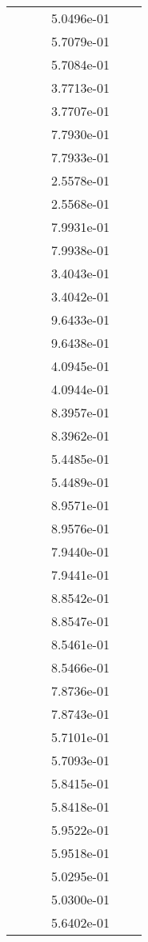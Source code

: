 \begin{xltabular}{\textwidth}{r|rS[table-format=1.3e+2]S[table-format=1.4e+2]S[table-format=1.4e+2]S[table-format=-1.5]}
&  &  & 5.0496e-01 & & \\
&  &  & 5.7079e-01 & & \\
&  &  & 5.7084e-01 & & \\
&  &  & 3.7713e-01 & & \\
&  &  & 3.7707e-01 & & \\
&  &  & 7.7930e-01 & & \\
&  &  & 7.7933e-01 & & \\
&  &  & 2.5578e-01 & & \\
&  &  & 2.5568e-01 & & \\
&  &  & 7.9931e-01 & & \\
&  &  & 7.9938e-01 & & \\
&  &  & 3.4043e-01 & & \\
&  &  & 3.4042e-01 & & \\
&  &  & 9.6433e-01 & & \\
&  &  & 9.6438e-01 & & \\
&  &  & 4.0945e-01 & & \\
&  &  & 4.0944e-01 & & \\
&  &  & 8.3957e-01 & & \\
&  &  & 8.3962e-01 & & \\
&  &  & 5.4485e-01 & & \\
&  &  & 5.4489e-01 & & \\
&  &  & 8.9571e-01 & & \\
&  &  & 8.9576e-01 & & \\
&  &  & 7.9440e-01 & & \\
&  &  & 7.9441e-01 & & \\
&  &  & 8.8542e-01 & & \\
&  &  & 8.8547e-01 & & \\
&  &  & 8.5461e-01 & & \\
&  &  & 8.5466e-01 & & \\
&  &  & 7.8736e-01 & & \\
&  &  & 7.8743e-01 & & \\
&  &  & 5.7101e-01 & & \\
&  &  & 5.7093e-01 & & \\
&  &  & 5.8415e-01 & & \\
&  &  & 5.8418e-01 & & \\
&  &  & 5.9522e-01 & & \\
&  &  & 5.9518e-01 & & \\
&  &  & 5.0295e-01 & & \\
&  &  & 5.0300e-01 & & \\
&  &  & 5.6402e-01 & & \\

\end{xltabular}
